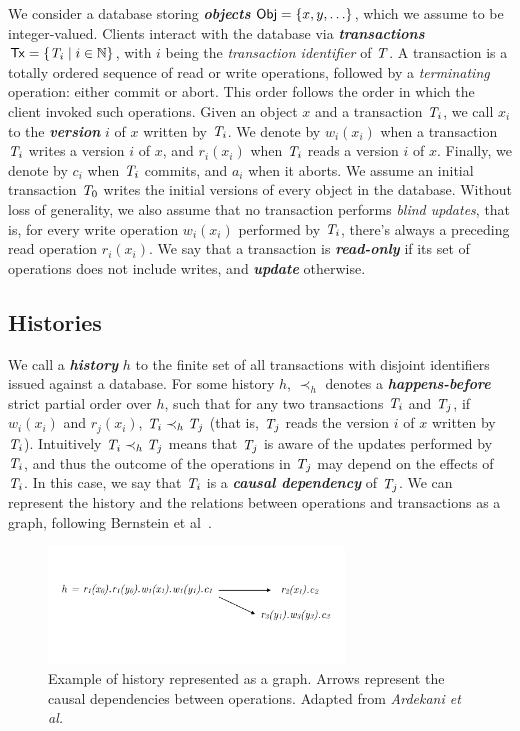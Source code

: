 We consider a database storing \textbf{\em objects} ${\sf Obj} = \{x, y, \ldots\}$, which we assume to be integer-valued. Clients interact with the database via \textbf{\em transactions} ${\sf Tx} = \{\mathit{T}_i \mid i \in \mathbb{N}\}$, with $i$ being the \emph{transaction identifier} of $\mathit{T}$. A transaction is a totally ordered sequence of read or write operations, followed by a \emph{terminating} operation: either commit or abort. This order follows the order in which the client invoked such operations. Given an object $x$ and a transaction $\mathit{T}_i$, we call $x_i$ to the \textbf{\em version} $i$ of $x$ written by $\mathit{T}_i$. We denote by $w_i(x_i)$ when a transaction $\mathit{T}_i$ writes a version $i$ of $x$, and $r_i(x_i)$ when $\mathit{T}_i$ reads a version $i$ of $x$. Finally, we denote by $c_i$ when $\mathit{T}_i$ commits, and $a_i$ when it aborts. We assume an initial transaction $\mathit{T}_0$ writes the initial versions of every object in the database. Without loss of generality, we also assume that no transaction performs \emph{blind updates}, that is, for every write operation $w_i(x_i)$ performed by $\mathit{T}_i$, there's always a preceding read operation $r_i(x_i)$. We say that a transaction is \textbf{\em read-only} if its set of operations does not include writes, and \textbf{\em update} otherwise.

\subsection{Histories}

We call a \textbf{\em history} $h$ to the finite set of all transactions with disjoint identifiers issued against a database. For some history $h$, $\prec_h$ denotes a \textbf{\em happens-before} strict partial order over $h$, such that for any two transactions $\mathit{T}_i$ and $\mathit{T}_j$, if $w_i(x_i)$ and $r_j(x_i)$, $\mathit{T}_i \prec_h \mathit{T}_j$ (that is, $\mathit{T}_j$ reads the version $i$ of $x$ written by $\mathit{T}_i$). Intuitively $\mathit{T}_i \prec_h \mathit{T}_j$ means that $\mathit{T}_j$ is aware of the updates performed by $\mathit{T}_i$, and thus the outcome of the operations in $\mathit{T}_j$ may depend on the effects of $\mathit{T}_i$. In this case, we say that $\mathit{T}_i$ is a \textbf{\em causal dependency} of $\mathit{T}_j$. We can represent the history and the relations between operations and transactions as a graph, following Bernstein et al~\citep{bernstein_concurrency}.

\begin{figure}[h]
  \centering
  \vspace{-0.4cm}
  \includegraphics[width=0.7\textwidth]{figures/history.pdf}
  \vspace{-1cm}
  \caption{Example of history represented as a graph. Arrows represent the causal dependencies between operations. Adapted from \em{Ardekani et al.~\citep{ardekani-nsmi}}}
  \label{fig:history}
\end{figure}

